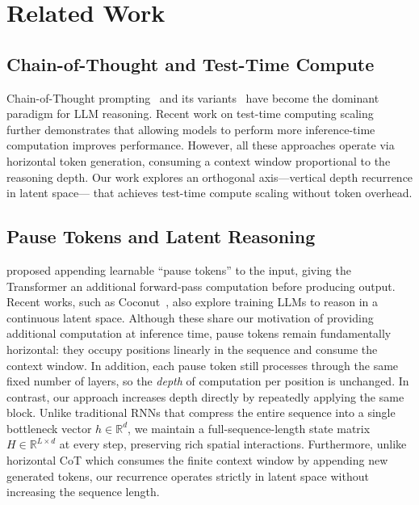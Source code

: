 \section{Related Work}
\label{sec:related}

\subsection{Chain-of-Thought and Test-Time Compute}

Chain-of-Thought prompting~\citep{wei2022chain} and its variants~\citep{kojima2022large, wang2022self} have become the dominant paradigm for LLM reasoning. Recent work on test-time computing scaling~\citep{snell2024scaling} further demonstrates that allowing models to perform more inference-time computation improves performance. However, all these approaches operate via horizontal token generation, consuming a context window proportional to the reasoning depth. Our work explores an orthogonal axis---vertical depth recurrence in latent space--- that achieves test-time compute scaling without token overhead.
 
\subsection{Pause Tokens and Latent Reasoning}

\citet{goyal2023think} proposed appending learnable ``pause tokens'' to the input, giving the Transformer an additional forward-pass computation before producing output. Recent works, such as Coconut~\citep{hao2024training}, also explore training LLMs to reason in a continuous latent space. Although these share our motivation of providing additional computation at inference time, pause tokens remain fundamentally horizontal: they occupy positions linearly in the sequence and consume the context window. In addition, each pause token still processes through the same fixed number of layers, so the \emph{depth} of computation per position is unchanged. In contrast, our approach increases depth directly by repeatedly applying the same block. Unlike traditional RNNs that compress the entire sequence into a single bottleneck vector $h \in \mathbb{R}^d$, we maintain a full-sequence-length state matrix $H \in \mathbb{R}^{L \times d}$ at every step, preserving rich spatial interactions. Furthermore, unlike horizontal CoT which consumes the finite context window by appending new generated tokens, our recurrence operates strictly in latent space without increasing the sequence length.
 
